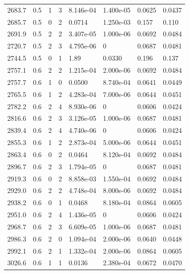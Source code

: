 \documentclass[preview]{standalone}
\begin{document}
{{{{{\begin{tabular}{L{1.2cm}C{1.2cm} C{0.3cm}C{0.5cm} C{1.4cm}C{1.4cm} C{1.4cm}C{1.4cm}}
  2683.7  &   0.5  & 1     &  3 &  8.146e-04  & 1.400e-05  & 0.0625 &  0.0437   \\ 
  2685.7  &   0.5  & 0     &  2 &  0.0714  & 1.250e-03  & 0.157 &  0.110   \\ 
  2691.9  &   0.5  & 2     &  2 &  3.407e-05  & 1.000e-06  & 0.0692 &  0.0484   \\ 
  2720.7  &   0.5  & 2     &  3 &  4.795e-06  & 0  & 0.0687 &  0.0481   \\ 
  2744.5  &   0.5  & 0     &  1 &  1.89  & 0.0330  & 0.196 &  0.137   \\ 
  2757.1  &   0.6  & 2     &  2 &  1.215e-04  & 2.000e-06  & 0.0692 &  0.0484   \\ 
  2757.7  &   0.6  & 1     &  0 &  0.0500  & 8.740e-04  & 0.0641 &  0.0449   \\ 
  2765.5  &   0.6  & 1     &  2 &  4.283e-04  & 7.000e-06  & 0.0644 &  0.0451   \\ 
  2782.2  &   0.6  & 2     &  4 &  8.930e-06  & 0  & 0.0606 &  0.0424   \\ 
  2816.6  &   0.6  & 2     &  3 &  3.126e-05  & 1.000e-06  & 0.0687 &  0.0481   \\ 
  2839.4  &   0.6  & 2     &  4 &  4.740e-06  & 0  & 0.0606 &  0.0424   \\ 
  2855.3  &   0.6  & 1     &  2 &  2.873e-04  & 5.000e-06  & 0.0644 &  0.0451   \\ 
  2863.4  &   0.6  & 0     &  2 &  0.0464  & 8.120e-04  & 0.0692 &  0.0484   \\ 
  2896.7  &   0.6  & 2     &  3 &  1.794e-05  & 0  & 0.0687 &  0.0481   \\ 
  2919.3  &   0.6  & 0     &  2 &  8.858e-03  & 1.550e-04  & 0.0692 &  0.0484   \\ 
  2929.0  &   0.6  & 2     &  2 &  4.748e-04  & 8.000e-06  & 0.0692 &  0.0484   \\ 
  2938.2  &   0.6  & 0     &  1 &  0.0468  & 8.180e-04  & 0.0864 &  0.0605   \\ 
  2951.0  &   0.6  & 2     &  4 &  1.436e-05  & 0  & 0.0606 &  0.0424   \\ 
  2968.7  &   0.6  & 2     &  3 &  6.609e-05  & 1.000e-06  & 0.0687 &  0.0481   \\ 
  2986.3  &   0.6  & 2     &  0 &  1.094e-04  & 2.000e-06  & 0.0640 &  0.0448   \\ 
  2992.1  &   0.6  & 2     &  1 &  1.332e-04  & 2.000e-06  & 0.0864 &  0.0605   \\ 
  3026.6  &   0.6  & 1     &  1 &  0.0136  & 2.380e-04  & 0.0672 &  0.0470   \\ 

\end{tabular}}}}}}
\end{document}
